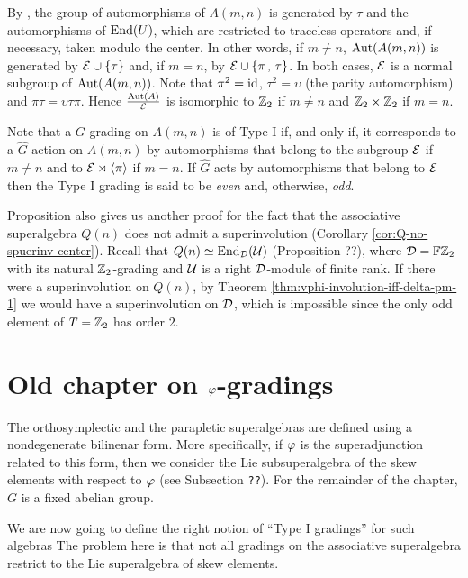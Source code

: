 By \cite[Theorem 1]{serganova}, the group of automorphisms of $A(m,n)$ is generated by $\tau$ and the automorphisms of $\operatorname{End}(U)$, which are restricted to traceless operators and, if necessary, taken modulo the center. In other words, if $m\neq n$, $\operatorname{Aut}(A(m,n))$ is generated by $\mathcal E \cup \{\tau\}$ and, if $m=n$, by $\mathcal E \cup \{\pi\,,\,\tau\}$. In both cases, $\mathcal E$ is a normal subgroup of $\operatorname{Aut}(A(m,n))$. Note that $\pi^2 = \operatorname{id}$, $\tau^2=\upsilon$ (the parity automorphism) and $\pi \tau = \upsilon \tau \pi$. Hence $\frac{\operatorname{Aut}(A)}{\mathcal E}$ is isomorphic to $\mathbb{Z}_{2}$ if $m\neq n$ and $\mathbb{Z}_2\times\mathbb{Z}_2$ if $m=n$.

Note that a $G$-grading on $A(m,n)$ is of Type I if, and only if, it corresponds to a $\widehat{G}$-action on $A(m,n)$ by automorphisms that belong to
the subgroup $\mathcal E$ if $m\ne n$ and to $\mathcal E\rtimes\langle\pi\rangle$ if $m=n$. If $\widehat{G}$ acts by automorphisms that belong to $\mathcal E$ then the
Type I grading is said to be \emph{even} and, otherwise, \emph{odd}.

\begin{remark}
	Proposition
	also gives us another proof for the fact that the associative superalgebra $Q(n)$ does not admit a superinvolution (Corollary \ref{cor:Q-no-spuerinv-center}).
	Recall that $Q(n) \simeq \operatorname{End}_{\mathcal{D}} (\mathcal U)$ (Proposition ??), where $\mathcal{D}= \mathbb{F}\mathbb{Z}_2$ with its natural $\mathbb{Z}_2$-grading and $\mathcal U$ is a right $\mathcal{D}$-module of finite rank.
	If there were a superinvolution on $Q(n)$, by Theorem \ref{thm:vphi-involution-iff-delta-pm-1} we would have a superinvolution on $\mathcal{D}$, which is impossible since the only odd element of $T = \mathbb{Z}_2$ has order $2$.
\end{remark}

\section{Old chapter on $\varphi$-gradings}

The orthosymplectic and the parapletic superalgebras are defined using a nondegenerate bilinenar form. More specifically, if $\varphi$ is the superadjunction related to this form, then we consider the Lie subsuperalgebra of the skew elements with respect to $\varphi$ (see Subsection {\tt ??}). For the remainder of the chapter, $G$ is a fixed abelian group.

We are now going to define the right notion of ``Type I gradings'' for such algebras %
The problem here is that not all gradings on the associative superalgebra restrict to the Lie superalgebra of skew elements.

